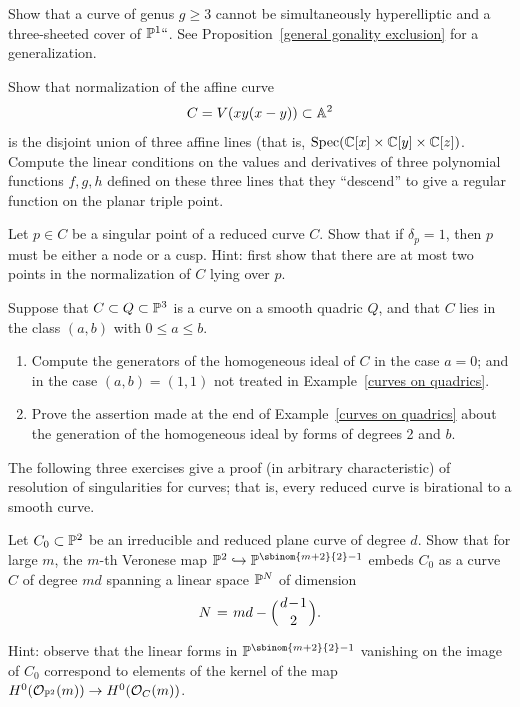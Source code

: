 \begin{exercise}\label{gonality exclusion}
%
%
Show that a curve of genus $g \geq 3$ cannot be simultaneously hyperelliptic and a three-sheeted cover of $\PP^1` `$.
See Proposition~\ref{general gonality exclusion} for a generalization.
\end{exercise}

\begin{exercise}\label{planar triple pt}
Show that normalization of the affine curve 
$$
C = V(xy(x-y)) \subset \AA^2
$$ 
is the disjoint union of three
affine lines (that is, $\Spec(\CC[x] \times \CC[y]\times \CC[z])$. Compute the linear conditions on the values and derivatives of three polynomial functions $f,g,h$ defined on
these three lines that they ``descend'' to give a regular function on
the planar 
triple point.
%
\end{exercise}

\begin{exercise}\label{delta=1 characterization}
Let $p \in C$ be a singular point of a reduced curve $C$. Show that if $\delta_p = 1$, then $p$ must be either a node or a cusp.
%
Hint: first show that there are at most two points in the normalization of $C$ lying over $p$.
\end{exercise}

\begin{exercise}\label{curve on rank 4 quadric}
 Suppose that $C\subset Q\subset \PP^{3}$ is a curve on a smooth quadric $Q$, and that $C$ lies
 in the class $(a,b)$ with $0\leq a\leq b$.

 
\begin{enumerate}
 \item Compute the generators of the homogeneous ideal of $C$ in the case $a=0$; and in the case
 $(a,b) = (1,1)$ not treated in Example~\ref{curves on quadrics}.
 \item Prove the assertion  
made at the end of Example~\ref{curves on quadrics}
about the generation of the homogeneous ideal by forms of degrees 2 and $b$.
\end{enumerate}
\end{exercise}

The following three exercises give a proof (in arbitrary characteristic) of resolution of singularities for curves; that is, every reduced curve is birational to a smooth curve.
%

\begin{exercise}\label{Veronese of plane curve}
Let $C_0 \subset \PP^2$ be an irreducible and reduced plane curve of degree $d$. Show that for large $m$, the $m$-th Veronese map $\PP^2 \hookrightarrow \PP^{\sbinom{m+2}{2} - 1}$ embeds $C_0$ as a curve $C$ of degree $md$ spanning a linear space $\PP^N$ of dimension
$$
N \; = \; md - \mbinom{d-1}{2}.
$$

Hint: observe that the linear forms in $\PP^{\sbinom{m+2}{2} - 1}$ vanishing on the image of $C_0$ correspond to elements of the kernel of the map $H^0(\cO_{\PP^2}(m)) \to H^0(\cO_{C}(m))$.
\end{exercise}


